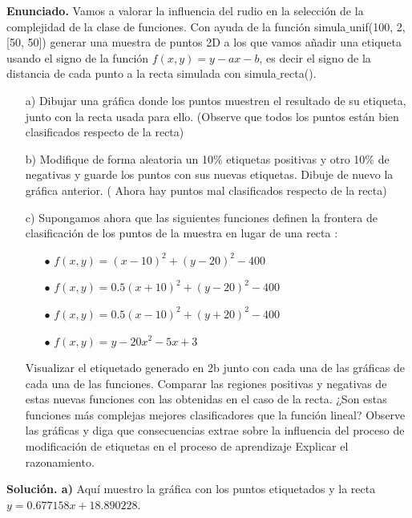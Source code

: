 \documentclass[a4paper,11pt]{article}
\begin{document}
\textbf{Enunciado.} Vamos a valorar la influencia del rudio en la selección de la complejidad de la clase de
funciones. Con ayuda de la función simula$\_$unif(100, 2, [50, 50]) generar una muestra de puntos 2D a los que vamos añadir una etiqueta usando el signo de la función $f(x, y) =
y - ax - b$, es decir el signo de la distancia de cada punto a la recta simulada con simula$\_$recta().
\begin{itemize}

\item[a)] Dibujar una gráfica donde los puntos muestren el resultado de su etiqueta, junto con la recta usada para ello. (Observe que todos los puntos están bien clasificados respecto de la recta)

\item[b)] Modifique de forma aleatoria un 10$\%$ etiquetas positivas y otro 10$\%$ de negativas y guarde los puntos con sus nuevas etiquetas. Dibuje de nuevo la gráfica
anterior. ( Ahora hay puntos mal clasificados respecto de la recta)

\item[c)] Supongamos ahora que las siguientes funciones definen la frontera de clasificación de los puntos de la muestra en lugar de una recta :
\begin{itemize}
\item[$\bullet$] $f(x, y) = (x - 10)^2 + (y - 20)^2 - 400$
\item[$\bullet$] $f(x, y) = 0.5(x + 10)^2 + (y - 20)^2 - 400$
\item[$\bullet$] $f(x, y) = 0.5(x - 10)^2 + (y + 20)^2 - 400$
\item[$\bullet$] $f(x, y) = y - 20x^2 - 5x + 3$
\end{itemize}

Visualizar el etiquetado generado en 2b junto con cada una de las gráficas de cada una de las funciones. Comparar las regiones positivas y negativas de estas nuevas funciones
con las obtenidas en el caso de la recta. ¿Son estas funciones más complejas mejores clasificadores que la función lineal? Observe las gráficas y diga que consecuencias extrae sobre la influencia del proceso de modificación de etiquetas en el proceso de
aprendizaje Explicar el razonamiento.

\end{itemize}

\textbf{Solución. a)} Aquí muestro la gráfica con los puntos etiquetados y la recta $y=0.677158x+18.890228$.
\end{document}
